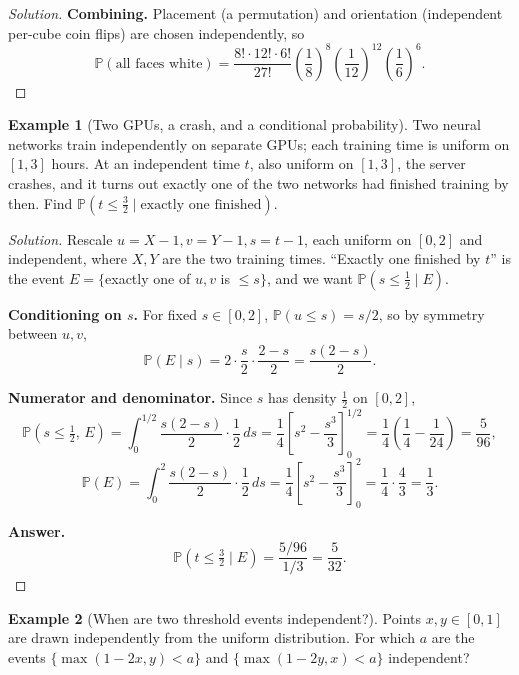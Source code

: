 \documentclass[11pt]{article}
\theoremstyle{definition}
\newtheorem{example}{Example}[section]
\begin{document}
\begin{proof}[Solution]
\textbf{Combining.} Placement (a permutation) and orientation (independent per-cube coin flips) are chosen independently, so
\[
\mathbb P(\text{all faces white})=\boxed{\frac{8!\cdot12!\cdot6!}{27!}\left(\frac18\right)^{8}\left(\frac1{12}\right)^{12}\left(\frac16\right)^{6}}.
\]
\end{proof}

\begin{example}[Two GPUs, a crash, and a conditional probability]
Two neural networks train independently on separate GPUs; each training time is uniform on $[1,3]$ hours. At an independent time $t$, also uniform on $[1,3]$, the server crashes, and it turns out exactly one of the two networks had finished training by then. Find $\mathbb P(t\le\tfrac32\mid\text{exactly one finished})$.
\end{example}

\begin{proof}[Solution]
Rescale $u=X-1,v=Y-1,s=t-1$, each uniform on $[0,2]$ and independent, where $X,Y$ are the two training times. ``Exactly one finished by $t$'' is the event $E=\{$exactly one of $u,v$ is $\le s\}$, and we want $\mathbb P(s\le\tfrac12\mid E)$.

\textbf{Conditioning on $s$.} For fixed $s\in[0,2]$, $\mathbb P(u\le s)=s/2$, so by symmetry between $u,v$,
\[
\mathbb P(E\mid s)=2\cdot\frac s2\cdot\frac{2-s}2=\frac{s(2-s)}2.
\]

\textbf{Numerator and denominator.} Since $s$ has density $\tfrac12$ on $[0,2]$,
\[
\mathbb P(s\le\tfrac12,\,E)=\int_0^{1/2}\frac{s(2-s)}2\cdot\frac12\,ds=\frac14\left[s^2-\frac{s^3}3\right]_0^{1/2}=\frac14\left(\frac14-\frac1{24}\right)=\frac5{96},
\]
\[
\mathbb P(E)=\int_0^{2}\frac{s(2-s)}2\cdot\frac12\,ds=\frac14\left[s^2-\frac{s^3}3\right]_0^{2}=\frac14\cdot\frac43=\frac13.
\]

\textbf{Answer.}
\[
\mathbb P(t\le\tfrac32\mid E)=\frac{5/96}{1/3}=\boxed{\frac5{32}}.
\]
\end{proof}

\begin{example}[When are two threshold events independent?]
Points $x,y\in[0,1]$ are drawn independently from the uniform distribution. For which $a$ are the events $\{\max(1-2x,y)<a\}$ and $\{\max(1-2y,x)<a\}$ independent?
\end{example}
\end{document}
